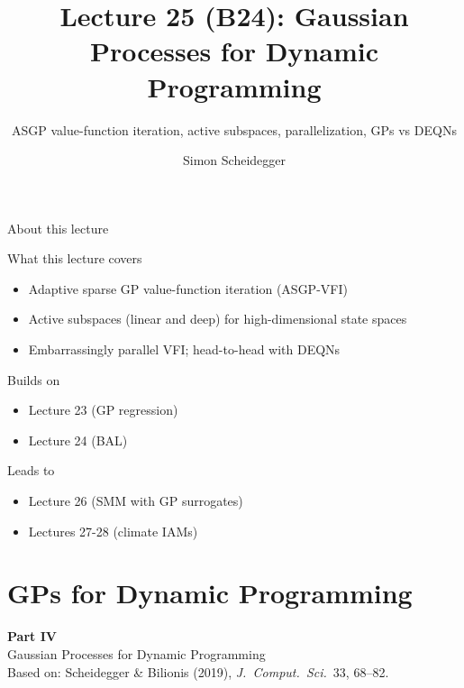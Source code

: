 \documentclass[aspectratio=169,11pt]{beamer}
\title[Lecture 25 (B24)]{Lecture 25 (B24): Gaussian Processes for Dynamic Programming}
\subtitle{ASGP value-function iteration, active subspaces, parallelization, GPs vs DEQNs}
\author{Simon Scheidegger}
\institute{HEC, University of Lausanne}
\date{}
\begin{document}
\providecommand{\exercisepause}{%
  \tikz[baseline=(X.base)]{\node[fill=darkgreen!80!black, text=white,
  rounded corners=2pt, inner sep=3pt, font=\scriptsize\bfseries](X){PAUSE};}}

{
\begin{frame}
\titlepage
\end{frame}
}

\begin{frame}{About this lecture}
\small
\begin{block}{What this lecture covers}
\begin{itemize}\itemsep2pt
  \item Adaptive sparse GP value-function iteration (ASGP-VFI)
  \item Active subspaces (linear and deep) for high-dimensional state spaces
  \item Embarrassingly parallel VFI; head-to-head with DEQNs
\end{itemize}
\end{block}
\begin{block}{Builds on}
\begin{itemize}\itemsep2pt
  \item Lecture 23 (GP regression)
  \item Lecture 24 (BAL)
\end{itemize}
\end{block}
\begin{block}{Leads to}
\begin{itemize}\itemsep2pt
  \item Lecture 26 (SMM with GP surrogates)
  \item Lectures 27-28 (climate IAMs)
\end{itemize}
\end{block}
\end{frame}

\section{GPs for Dynamic Programming}

\begin{frame}{}
\vfill
\begin{center}
{\Huge \textcolor{uzhblue}{\textbf{Part IV}}}\\[12pt]
{\LARGE Gaussian Processes for Dynamic Programming}\\[8pt]
{\small Based on: Scheidegger \& Bilionis (2019), \emph{J.\ Comput.\ Sci.}\ 33, 68--82.}
\end{center}
\vfill
\end{frame}
\end{document}
